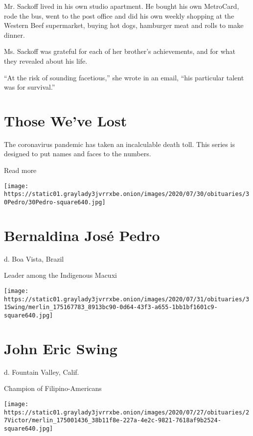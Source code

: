 Mr. Sackoff lived in his own studio apartment. He bought his own
MetroCard, rode the bus, went to the post office and did his own weekly
shopping at the Western Beef supermarket, buying hot dogs, hamburger
meat and rolls to make dinner.

Ms. Sackoff was grateful for each of her brother's achievements, and for
what they revealed about his life.

``At the risk of sounding facetious,'' she wrote in an email, ``his
particular talent was for survival.''

\href{https://www.nytimes3xbfgragh.onion/interactive/2020/obituaries/people-died-coronavirus-obituaries.html?action=click\&pgtype=Article\&state=default\&region=BELOW_MAIN_CONTENT\&context=covid_obits_promo}{}

\hypertarget{those-weve-lost}{%
\section{Those We've Lost}\label{those-weve-lost}}

The coronavirus pandemic has taken an incalculable death toll. This
series is designed to put names and faces to the numbers.

Read more

\texttt{[image: https://static01.graylady3jvrrxbe.onion/images/2020/07/30/obituaries/30Pedro/30Pedro-square640.jpg]}

\hypertarget{bernaldina-josuxe9-pedro}{%
\section{Bernaldina José Pedro}\label{bernaldina-josuxe9-pedro}}

d. Boa Vista, Brazil

Leader among the Indigenous Macuxi

\texttt{[image: https://static01.graylady3jvrrxbe.onion/images/2020/07/31/obituaries/31Swing/merlin\_175167783\_8913bc90-0d64-43f3-a655-1bb1bf1601c9-square640.jpg]}

\hypertarget{john-eric-swing}{%
\section{John Eric Swing}\label{john-eric-swing}}

d. Fountain Valley, Calif.

Champion of Filipino-Americans

\texttt{[image: https://static01.graylady3jvrrxbe.onion/images/2020/07/27/obituaries/27Victor/merlin\_175001436\_38b11f8e-227a-4e2c-9821-7618af9b2524-square640.jpg]}

